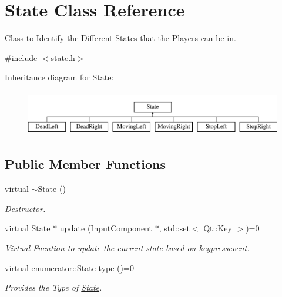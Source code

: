 \hypertarget{classState}{\section{State Class Reference}
\label{classState}
}


Class to Identify the Different States that the Players can be in.  




{\ttfamily \#include $<$state.\-h$>$}

Inheritance diagram for State\-:\begin{figure}[H]
\begin{center}
\leavevmode
\includegraphics[height=2.000000cm]{classState}
\end{center}
\end{figure}
\subsection*{Public Member Functions}
\begin{DoxyCompactItemize}
\item 
\hypertarget{classState_a9ddc1df6f998184d6477b48fab90281c}{virtual \hyperlink{classState_a9ddc1df6f998184d6477b48fab90281c}{$\sim$\-State} ()}\label{classState_a9ddc1df6f998184d6477b48fab90281c}

\begin{DoxyCompactList}\small\item\em Destructor. \end{DoxyCompactList}\item 
virtual \hyperlink{classState}{State} $\ast$ \hyperlink{classState_a5f2bc9804614c5ca9e7feb7d8c57668d}{update} (\hyperlink{classInputComponent}{Input\-Component} $\ast$, std\-::set$<$ Qt\-::\-Key $>$)=0
\begin{DoxyCompactList}\small\item\em Virtual Fucntion to update the current state based on keypressevent. \end{DoxyCompactList}\item 
virtual \hyperlink{namespaceenumerator_a5fc7b342c2c633e1037b07cea237a222}{enumerator\-::\-State} \hyperlink{classState_a8c6cc1ff1ecdf88e586f857339b7e071}{type} ()=0
\begin{DoxyCompactList}\small\item\em Provides the Type of \hyperlink{classState}{State}. \end{DoxyCompactList}\end{DoxyCompactItemize}


